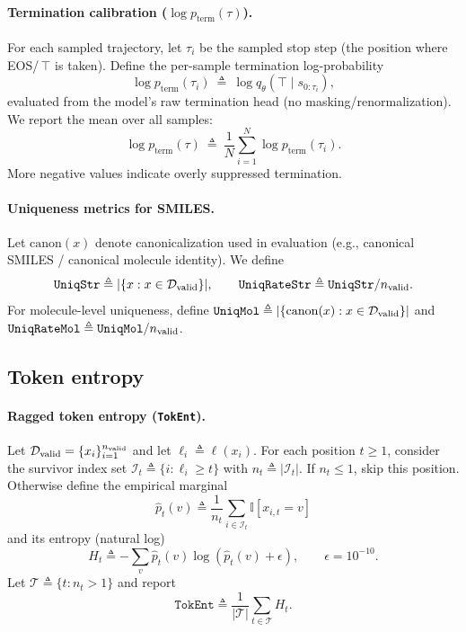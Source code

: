\documentclass{article}
\theoremstyle{plain}
\theoremstyle{definition}
\theoremstyle{remark}
\begin{document}
\paragraph{Termination calibration (\texorpdfstring{$\log p_{\mathrm{term}}(\tau)$}{log p_term(tau)}).}
For each sampled trajectory, let $\tau_i$ be the sampled stop step (the position where EOS/\,$\top$ is taken).
Define the per-sample termination log-probability
\[
\log p_{\mathrm{term}}(\tau_i)\ \triangleq\ \log q_\theta(\top\mid s_{0:\tau_i}),
\]
evaluated from the model's raw termination head (no masking/renormalization).
We report the mean over all samples:
\[
\log p_{\mathrm{term}}(\tau)\ \triangleq\ \frac{1}{N}\sum_{i=1}^{N}\log p_{\mathrm{term}}(\tau_i).
\]
More negative values indicate overly suppressed termination.

\paragraph{Uniqueness metrics for SMILES.}
Let $\mathrm{canon}(x)$ denote canonicalization used in evaluation (e.g., canonical SMILES / canonical molecule identity).
We define
\[
\texttt{UniqStr}\triangleq |\{x: x\in\mathcal{D}_{\mathrm{valid}}\}|,\qquad
\texttt{UniqRateStr}\triangleq \texttt{UniqStr}/n_{\mathrm{valid}}.
\]
For molecule-level uniqueness, define $\texttt{UniqMol}\triangleq |\{\mathrm{canon}(x): x\in\mathcal{D}_{\mathrm{valid}}\}|$ and
$\texttt{UniqRateMol}\triangleq \texttt{UniqMol}/n_{\mathrm{valid}}$.


\subsection{Token entropy}
\label{app:metrics_tokent}

\paragraph{Ragged token entropy (\texttt{TokEnt}).}
Let $\mathcal{D}_{\mathrm{valid}}=\{x_i\}_{i=1}^{n_{\mathrm{valid}}}$ and let $\ell_i\triangleq\ell(x_i)$.
For each position $t\ge 1$, consider the survivor index set $\mathcal{I}_t\triangleq\{i:\ell_i\ge t\}$ with $n_t\triangleq|\mathcal{I}_t|$.
If $n_t\le 1$, skip this position. Otherwise define the empirical marginal
\[
\hat p_t(v)\triangleq \frac{1}{n_t}\sum_{i\in\mathcal{I}_t}\mathbb{I}[x_{i,t}=v]
\]
and its entropy (natural log)
\[
H_t\triangleq-\sum_v\hat p_t(v)\log(\hat p_t(v)+\epsilon),\qquad \epsilon=10^{-10}.
\]
Let $\mathcal{T}\triangleq\{t:n_t>1\}$ and report
\[
\texttt{TokEnt}\triangleq \frac{1}{|\mathcal{T}|}\sum_{t\in\mathcal{T}} H_t.
\]
\end{document}
